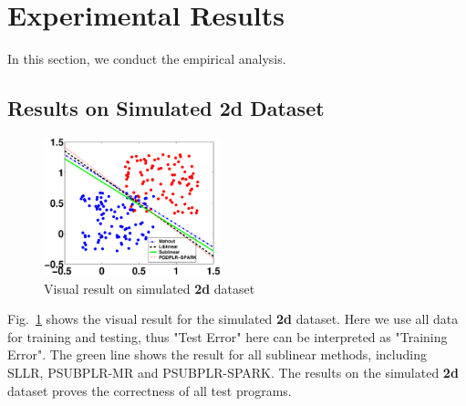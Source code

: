 \documentclass[10pt, conference, compsocconf]{IEEEtran}
\begin{document}
\section{Experimental Results} \label{sec:experiment}
In this section, we conduct the empirical analysis.

\subsection{Results on Simulated 2d Dataset}
%
\begin{figure}[tb]
\center \includegraphics[height=4cm,width=5.14cm]{img/2d-show.eps}\vspace{-0.3cm}
\caption{Visual result on simulated \textbf{2d} dataset}\label{fig:02}\vspace{-0.5cm}
\end{figure}
%
Fig.~\ref{fig:02} shows the visual result for the simulated \textbf{2d} dataset.
Here we use all data for training and testing, thus "Test Error" here can be interpreted as "Training Error".
The green line shows the result for all sublinear methods, including SLLR, PSUBPLR-MR and PSUBPLR-SPARK.
The results on the simulated \textbf{2d} dataset proves the correctness of all test programs.
\end{document}

